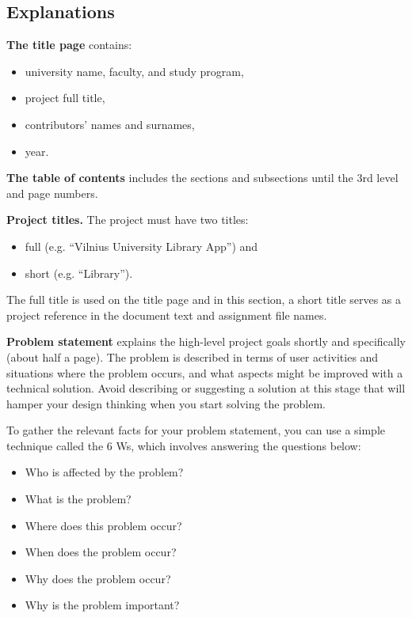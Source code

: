 \documentclass[]{VUMIFTemplateClass}
\begin{document}
\subsection*{Explanations}

\textbf{The title page} contains:
\begin{itemize}
    \item university name, faculty, and study program, \checkmark
    \item project full title, \checkmark
    \item contributors' names and surnames, \checkmark
    \item year. \checkmark
\end{itemize}

\textbf{The table of contents} includes the sections and subsections until the 3rd level and page numbers. \checkmark

\textbf{Project titles.} The project must have two titles: \checkmark
\begin{itemize} 
    \item full (e.g. ``Vilnius University Library App'') and \checkmark
    \item short (e.g. ``Library''). \checkmark
\end{itemize}

The full title is used on the title page and in this section, a short title serves as a project reference in the document text and assignment file names. \checkmark

\textbf{Problem statement} explains the high-level project goals shortly and
specifically (about half a page). The problem is described in terms of user
activities and situations where the problem occurs, and what aspects might be
improved with a technical solution. Avoid describing or suggesting a solution at
this stage that will hamper your design thinking when you start solving the
problem. \checkmark

To gather the relevant facts for your problem statement, you can use a simple
technique called the 6 Ws, which involves answering the questions below: \checkmark
\begin{itemize}
    \item Who is affected by the problem? \checkmark
    \item What is the problem? \checkmark
    \item Where does this problem occur? \checkmark
    \item When does the problem occur? \checkmark
    \item Why does the problem occur? \checkmark
    \item Why is the problem important? \checkmark
\end{itemize}
\end{document}
